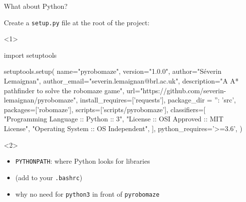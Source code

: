 \documentclass[compress]{beamer}
\begin{document}

\begin{frame}[fragile]{What about Python?}

Create a \texttt{setup.py} file at the root of the project:
    \begin{onlyenv}<1>
\begin{pythoncode}
import setuptools

setuptools.setup(
    name="pyrobomaze",
    version="1.0.0",
    author="Séverin Lemaignan",
    author_email="severin.lemaignan@brl.ac.uk",
    description="A A* pathfinder to solve the robomaze game",
    url="https://github.com/severin-lemaignan/pyrobomaze",
    install_requires=['requests'],
    package_dir = {'': 'src'},
    packages=['robomaze'],
    scripts=['scripts/pyrobomaze'],
    classifiers=[
        "Programming Language :: Python :: 3",
        "License :: OSI Approved :: MIT License",
        "Operating System :: OS Independent",
    ],
    python_requires='>=3.6',
)
\end{pythoncode}

    \end{onlyenv}
    \begin{onlyenv}<2>

        \begin{itemize}
            \item {\tt PYTHONPATH}: where Python looks for libraries
            \item {} (add to your {\tt .bashrc})
            \item why no need for {\tt python3} in front of {\tt pyrobomaze}
              
        \end{itemize}



    \end{onlyenv}

\end{frame}
\end{document}
